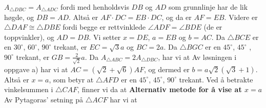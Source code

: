 {	
	$ A_{\triangle DBC}=A_{\triangle ADC} $ fordi med henholdsvis $ DB $ og $ AD $ som grunnlinje har de lik høgde, og $ DB=AD $. Altså er $ AF\cdot DC = EB\cdot DC $, og da er $ AF=EB $. Videre er $ \triangle DAF\cong \triangle DBE $ fordi begge er rettvinklede $ \angle ADF =\angle BDE$ (de er toppvinkler), og $ AD=DB $. Vi setter $ x=DE $, $ a=EB $ og $ b=AC $. Da $ \triangle BCE $ er en $ 30^\circ $, $ 60^\circ $, $ 90^\circ $ trekant, er $ EC=\sqrt{3}a $ og $ BC=2a $. Da $ \triangle BGC $ er en $ 45^\circ $, $ 45^\circ $ , $ 90^\circ $ trekant, er $ GB=\frac{2}{\sqrt{2}}a $. Da $ A_{\triangle ABC}=2A_{\triangle DBC} $, har vi at
	Av løsningen i oppgave a) har vi at $ {AC=(\sqrt{2}+\sqrt{6})AF}$, og dermed er $ b=a\sqrt{2}(\sqrt{3}+1)$. Altså er $ x=a $, som betyr at $ \triangle AFD $ er en $ 45^\circ $, $ 45^\circ $, $ 90^\circ $ trekant. Ved å betrakte vinkelsummen i $ \triangle CAF $, finner vi da at
	\textbf{Alternativ metode for å vise at \boldmath $ x=a $} \os
	Av Pytagoras' setning på $ \triangle ACF $ har vi at
}
\newpage
{}
